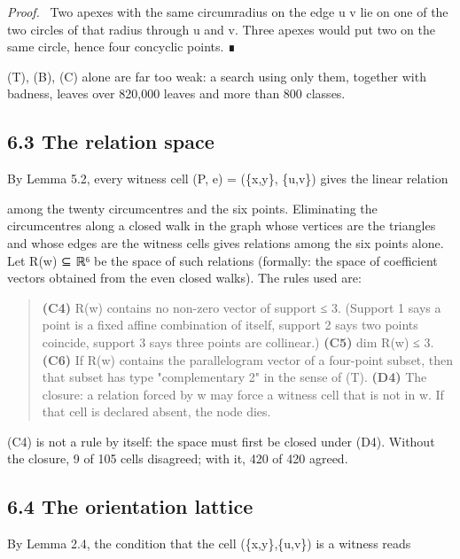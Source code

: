 \documentclass[11pt,a4paper]{article}
\theoremstyle{named}
\newenvironment{mdproof}[1][Proof]{\par\medskip\noindent\textit{#1.}\ }{\par\medskip}
\newcommand{\dispf}[1]{\par\smallskip{\centering #1\par}\smallskip}
\begin{document}
\begin{mdproof}[Proof]
Two apexes with the same circumradius on the edge u v lie on one of the two circles of that radius through u and v. Three apexes would put two on the same circle, hence four concyclic points. ∎
\end{mdproof}

(T), (B), (C) alone are far too weak: a search using only them, together with badness, leaves over 820,000 leaves and more than 800 classes.

\subsection*{6.3 The relation space}

By Lemma 5.2, every witness cell (P, e) = (\{x,y\}, \{u,v\}) gives the linear relation

\dispf{o(u v x) + o(u v y) = u + v}

among the twenty circumcentres and the six points. Eliminating the circumcentres along a closed walk in the graph whose vertices are the triangles and whose edges are the witness cells gives relations among the six points alone. Let R(w) ⊆ ℝ⁶ be the space of such relations (formally: the space of coefficient vectors obtained from the even closed walks). The rules used are:

\begin{quote}
\textbf{(C4)} R(w) contains no non-zero vector of support ≤ 3. (Support 1 says a point is a fixed affine combination of itself, support 2 says two points coincide, support 3 says three points are collinear.)
\textbf{(C5)} dim R(w) ≤ 3.
\textbf{(C6)} If R(w) contains the parallelogram vector of a four-point subset, then that subset has type "complementary 2" in the sense of (T).
\textbf{(D4)} The closure: a relation forced by w may force a witness cell that is not in w. If that cell is declared absent, the node dies.
\end{quote}

(C4) is not a rule by itself: the space must first be closed under (D4). Without the closure, 9 of 105 cells disagreed; with it, 420 of 420 agreed.

\subsection*{6.4 The orientation lattice}

By Lemma 2.4, the condition that the cell (\{x,y\},\{u,v\}) is a witness reads
\end{document}
